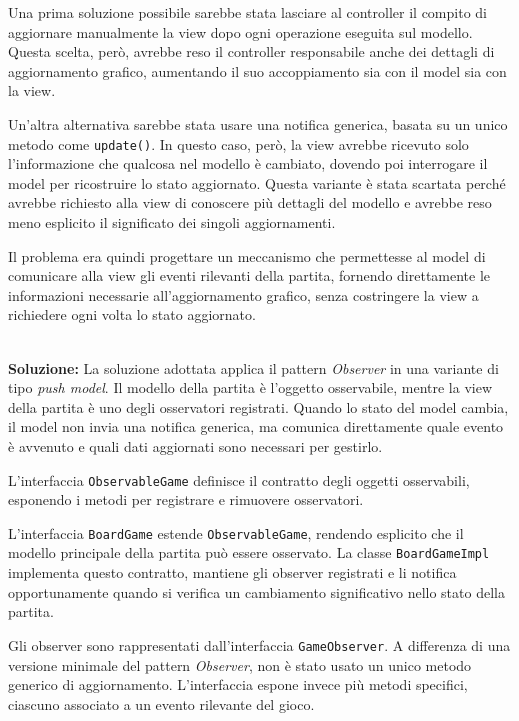 Una prima soluzione possibile sarebbe stata lasciare al controller il compito di
aggiornare manualmente la view dopo ogni operazione eseguita sul modello. Questa
scelta, però, avrebbe reso il controller responsabile anche dei dettagli di
aggiornamento grafico, aumentando il suo accoppiamento sia con il model sia con
la view.

Un'altra alternativa sarebbe stata usare una notifica generica, basata su un
unico metodo come \texttt{update()}. In questo caso, però, la view avrebbe
ricevuto solo l'informazione che qualcosa nel modello è cambiato, dovendo poi
interrogare il model per ricostruire lo stato aggiornato. Questa variante è
stata scartata perché avrebbe richiesto alla view di conoscere più dettagli del
modello e avrebbe reso meno esplicito il significato dei singoli aggiornamenti.

Il problema era quindi progettare un meccanismo che permettesse al model di
comunicare alla view gli eventi rilevanti della partita, fornendo direttamente
le informazioni necessarie all'aggiornamento grafico, senza costringere la view
a richiedere ogni volta lo stato aggiornato.

\textbf{\\Soluzione:} La soluzione adottata applica il pattern
\textit{Observer} in una variante di tipo \textit{push model}. Il modello della
partita è l'oggetto osservabile, mentre la view della partita è uno degli
osservatori registrati. Quando lo stato del model cambia, il model non invia
una notifica generica, ma comunica direttamente quale evento è avvenuto e quali
dati aggiornati sono necessari per gestirlo.

L'interfaccia \texttt{ObservableGame} definisce il contratto degli oggetti
osservabili, esponendo i metodi per registrare e rimuovere osservatori.

L'interfaccia \texttt{BoardGame} estende \texttt{ObservableGame}, rendendo
esplicito che il modello principale della partita può essere osservato. La
classe {\texttt{BoardGame\-Impl}} implementa questo contratto, mantiene gli
observer registrati e li notifica opportunamente quando si verifica un
cambiamento significativo nello stato della partita.

Gli observer sono rappresentati dall'interfaccia \texttt{GameObserver}. A
differenza di una versione minimale del pattern \textit{Observer}, non è stato
usato un unico metodo generico di aggiornamento. L'interfaccia espone invece
più metodi specifici, ciascuno associato a un evento rilevante del gioco.

